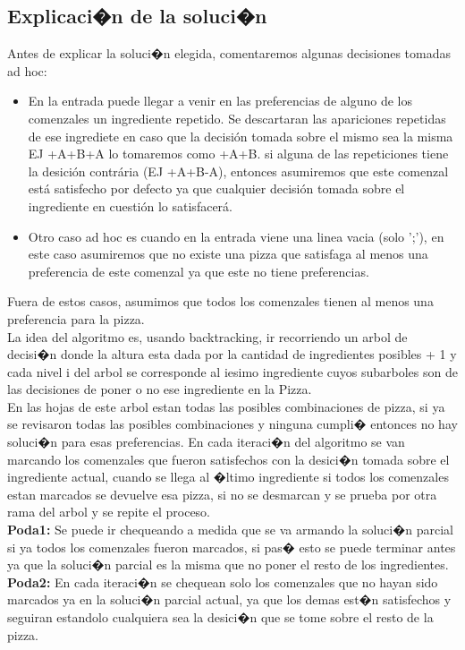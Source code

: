 \documentclass[11pt, a4paper, spanish]{article}
\begin{document}
	\subsection{Explicaci�n de la soluci�n}
	Antes de explicar la soluci�n elegida, comentaremos algunas decisiones tomadas ad hoc:
	\begin{itemize}
		\item En la entrada puede llegar a venir en las preferencias de alguno de los comenzales un ingrediente repetido. Se descartaran las apariciones repetidas de ese ingrediete en caso que la decisi\'on tomada sobre el mismo sea la misma EJ +A+B+A lo tomaremos como +A+B.
		si alguna de las repeticiones tiene la desici\'on contr\'aria (EJ +A+B-A), entonces asumiremos que este comenzal est\'a satisfecho por defecto ya que cualquier decisi\'on tomada sobre el ingrediente en cuesti\'on lo satisfacer\'a.
		\item Otro caso ad hoc es cuando en la entrada viene una linea vacia (solo ';'), en este caso asumiremos que no existe una pizza que satisfaga al menos una preferencia de este comenzal ya que este no tiene preferencias.
	\end{itemize}
	Fuera de estos casos, asumimos que todos los comenzales tienen al menos una preferencia para la pizza.\\
	La idea del algoritmo es, usando backtracking, ir recorriendo un arbol de decisi�n donde la altura esta dada por la cantidad de ingredientes posibles + 1 y cada nivel i del arbol se corresponde al iesimo ingrediente cuyos subarboles son de las decisiones de poner o no ese ingrediente en la Pizza.\\
	En las hojas de este arbol estan todas las posibles combinaciones de pizza, si ya se revisaron todas las posibles combinaciones y ninguna cumpli� entonces no hay soluci�n para esas preferencias.
	En cada iteraci�n del algoritmo se van marcando los comenzales que fueron satisfechos con la desici�n tomada sobre el ingrediente actual, cuando se llega al �ltimo ingrediente si todos los comenzales estan marcados se devuelve esa pizza, si no se desmarcan y se prueba por otra rama del arbol y se repite el proceso.\\
	\textbf{Poda1:} Se puede ir chequeando a medida que se va armando la soluci�n parcial si ya todos los comenzales fueron marcados, si pas� esto se puede terminar antes ya que la soluci�n parcial es la misma que no poner el resto de los ingredientes.\\
	\textbf{Poda2:} En cada iteraci�n se chequean solo los comenzales que no hayan sido marcados ya en la soluci�n parcial actual, ya que los demas est�n satisfechos y seguiran estandolo cualquiera sea la desici�n que se tome sobre el resto de la pizza.\\
\end{document}
